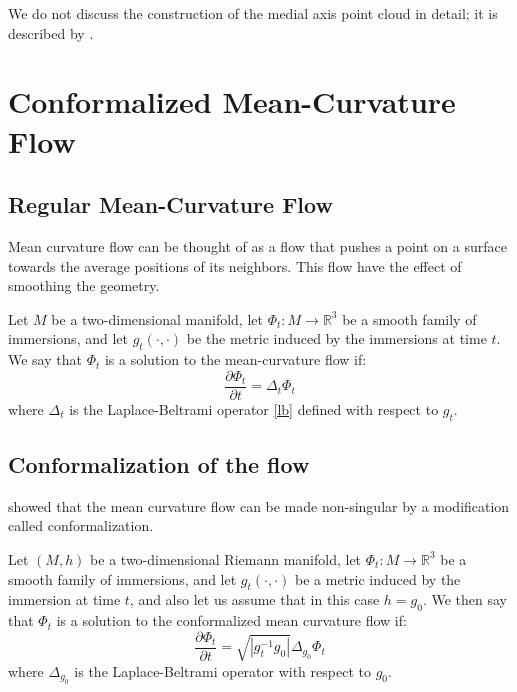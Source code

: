 \documentclass[
]{elteiktdk}[2024/04/26]
\begin{document}
	\begin{remark}
		We do not discuss the construction of the medial axis point cloud in detail; it is described by \textcite{Sugimoto:2024:PWoS}.
	\end{remark}
	
	\chapter{Conformalized Mean-Curvature Flow}
	\label{ch:cmcf}
	
	\section{Regular Mean-Curvature Flow}
	
	Mean curvature flow can be thought of as a flow that pushes a point on a surface towards the average positions of its neighbors. This flow have the effect of smoothing the geometry.
	
	\begin{definition}[MCF]
		Let $M$ be a two-dimensional manifold, let $\Phi_t: M \rightarrow \mathbb{R}^3$ be a smooth family of immersions, and let $g_t(\cdot,\cdot)$ be the metric induced by the immersions at time $t$. We say that $\Phi_t$ is a solution to the mean-curvature flow if:
		\begin{equation}
			\frac{\partial \Phi_t}{\partial t} = \Delta_t \Phi_t
		\end{equation}
		where $\Delta_t$ is the Laplace-Beltrami operator \ref{lb} defined with respect to $g_t$.
	\end{definition}
	
	\section{Conformalization of the flow}
	\label{sec:cmcf-def}
	
	\textcite{kazhdan2012nonsingular} showed that the mean curvature flow can be made non-singular by a modification called conformalization.
	
	\begin{definition}[cMCF]
		Let $(M,h)$ be a two-dimensional Riemann manifold, let $\Phi_t: M \rightarrow \mathbb{R}^3$ be a smooth family of immersions, and let $g_t(\cdot,\cdot)$ be a metric induced by the immersion at time $t$, and also let us assume that in this case $h = g_0$. We then say that $\Phi_t$ is a solution to the conformalized mean curvature flow if:
		\begin{equation}
			\label{cMFC}
			\frac{\partial\Phi_t}{\partial t} = \sqrt{\left| g_t^{-1} g_0\right|}\Delta_{g_0}\Phi_t
		\end{equation}
		where $\Delta_{g_0}$ is the Laplace-Beltrami operator with respect to $g_0$.
	\end{definition}
	
\end{document}
